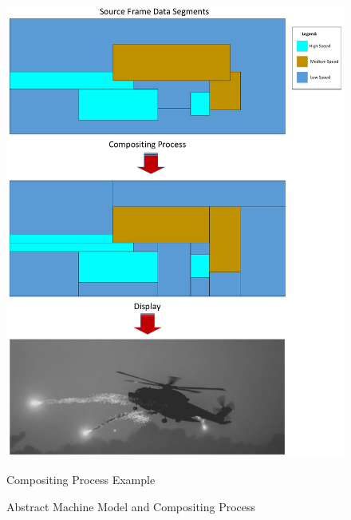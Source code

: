 \begin{figure}
        \centering
        \includegraphics[width=1.0\textwidth]{fig/compositing.pdf}
        \caption{Compositing Process Example}
        \label{fig:compositing}
    \caption{Abstract Machine Model and Compositing Process}
\end{figure}


